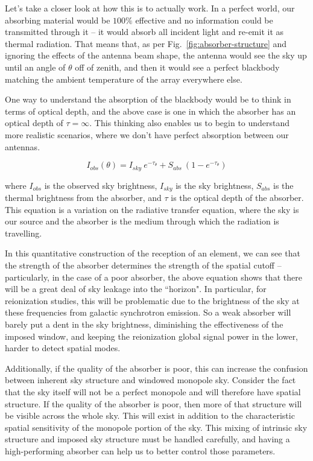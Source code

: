 Let's take a closer look at how this is to actually work. In a perfect world, 
our absorbing material would be $100\%$ effective and no information could be 
transmitted through it -- it would absorb all incident light and re-emit it as 
thermal radiation. That means that, as per Fig.~\ref{fig:absorber-structure} 
and ignoring the effects of the antenna beam shape, the antenna would see the 
sky up until an angle of $\theta$ off of zenith, and then it would see a 
perfect blackbody matching the ambient temperature of the array everywhere 
else.

One way to understand the absorption of the blackbody would be to think in 
terms of optical depth, and the above case is one in which the absorber has an 
optical depth of $\tau = \infty$. This thinking also enables us to begin to 
understand more realistic scenarios, where we don't have perfect absorption 
between our antennas.

\begin{equation}
    I_{obs}(\theta) = I_{sky}~e^{-\tau_\theta} + S_{abs}~(1 - e^{-\tau_\theta})
    \label{eq:abs-optical-depth}
\end{equation}

where $I_{obs}$ is the observed sky brightness, $I_{sky}$ is the sky 
brightness, $S_{abs}$ is the thermal brightness from the absorber, and $\tau$ 
is the optical depth of the absorber. This equation is a variation on the 
radiative transfer equation, where the sky is our source and the absorber is 
the medium through which the radiation is travelling.

In this quantitative construction of the reception of an element, we can see 
that the strength of the absorber determines the strength of the spatial cutoff 
-- particularly, in the case of a poor absorber, the above equation shows that 
there will be a great deal of sky leakage into the ``horizon". In particular, 
for reionization studies, this will be problematic due to the brightness of the 
sky at these frequencies from galactic synchrotron emission. So a weak absorber 
will barely put a dent in the sky brightness, diminishing the effectiveness of 
the imposed window, and keeping the reionization global signal power in the 
lower, harder to detect spatial modes.

Additionally, if the quality of the absorber is poor, this can increase the 
confusion between inherent sky structure and windowed monopole sky. Consider 
the fact that the sky itself will not be a perfect monopole and will therefore 
have spatial structure. If the quality of the absorber is poor, then more of 
that structure will be visible across the whole sky. This will exist in 
addition to the characteristic spatial sensitivity of the monopole portion of 
the sky. This mixing of intrinsic sky structure and imposed sky structure must 
be handled carefully, and having a high-performing absorber can help us to 
better control those parameters.


